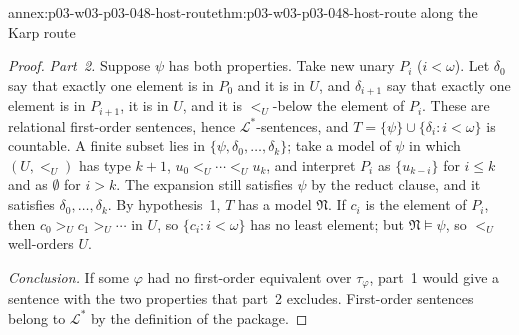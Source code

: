 \begin{annexitem}{annex:p03-w03-p03-048-host-route}{thm:p03-w03-p03-048-host-route}{ along the Karp route}
\begin{proof}
\emph{Part~2.}  Suppose \(\psi\) has both properties.  Take new unary
\(P_i\) (\(i<\omega\)).  Let \(\delta_0\) say that exactly one element is in
\(P_0\) and it is in \(U\), and \(\delta_{i+1}\) say that exactly one
element is in \(P_{i+1}\), it is in \(U\), and it is \(<_U\)-below the
element of \(P_i\).  These are relational first-order sentences, hence
\(\mathcal L^{\ast}\)-sentences, and
\(T=\{\psi\}\cup\{\delta_i:i<\omega\}\) is countable.  A finite subset lies
in \(\{\psi,\delta_0,\ldots,\delta_k\}\); take a model of \(\psi\) in which
\((U,<_U)\) has type \(k+1\), \(u_0<_U\cdots<_Uu_k\), and interpret \(P_i\)
as \(\{u_{k-i}\}\) for \(i\leq k\) and as \(\emptyset\) for \(i>k\).  The
expansion still satisfies \(\psi\) by the reduct clause, and it satisfies
\(\delta_0,\ldots,\delta_k\).  By hypothesis~1, \(T\) has a model
\(\mathfrak N\).  If \(c_i\) is the element of \(P_i\), then
\(c_0>_Uc_1>_U\cdots\) in \(U\), so \(\{c_i:i<\omega\}\) has no least
element; but \(\mathfrak N\models\psi\), so \(<_U\) well-orders \(U\).

\emph{Conclusion.}  If some \(\varphi\) had no first-order equivalent over
\(\tau_\varphi\), part~1 would give a sentence with the two properties that
part~2 excludes.  First-order sentences belong to \(\mathcal L^{\ast}\) by
the definition of the package.
\end{proof}
\end{annexitem}
